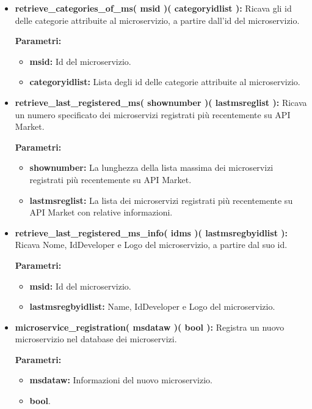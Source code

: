 \begin{itemize}
\begin{itemize}
			\item \textbf{retrieve\_categories\_of\_ms( msid )( categoryidlist ):} Ricava gli id delle categorie attribuite al microservizio, a partire dall'id del microservizio.
				\begin{description}
    				\item[\textbf{Parametri:}]
				\end{description}
				\begin{itemize}
					\item \textbf{msid:} Id del microservizio.
					\item \textbf{categoryidlist:} Lista degli id delle categorie attribuite al microservizio.
				\end{itemize}
				
			\item \textbf{retrieve\_last\_registered\_ms( shownumber )( lastmsreglist ):} Ricava un numero specificato dei microservizi registrati più recentemente su API Market.
				\begin{description}
    				\item[\textbf{Parametri:}]
				\end{description}
				\begin{itemize}
					\item \textbf{shownumber:} La lunghezza della lista massima dei microservizi registrati più recentemente su API Market.
					\item \textbf{lastmsreglist:} La lista dei microservizi registrati più recentemente su API Market con relative informazioni.
				\end{itemize}
				
			\item \textbf{retrieve\_last\_registered\_ms\_info( idms )( lastmsregbyidlist ):} Ricava Nome, IdDeveloper e Logo del microservizio, a partire dal suo id.
				\begin{description}
    				\item[\textbf{Parametri:}]
				\end{description}
				\begin{itemize}
					\item \textbf{msid:} Id del microservizio.
					\item \textbf{lastmsregbyidlist:} Name, IdDeveloper e Logo del microservizio.
				\end{itemize}
				
			\item \textbf{microservice\_registration( msdataw )( bool ):} Registra un nuovo microservizio nel database dei microservizi.
				\begin{description}
    				\item[\textbf{Parametri:}]
				\end{description}
				\begin{itemize}
					\item \textbf{msdataw:} Informazioni del nuovo microservizio.
					\item \textbf{bool}.
				\end{itemize}
				

\end{itemize}
\end{itemize}
